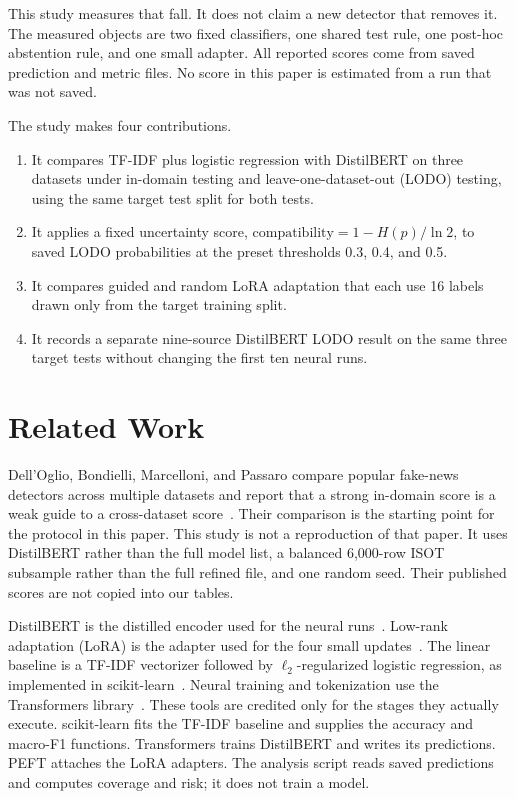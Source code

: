 \documentclass[conference,letterpaper]{IEEEtran}
\begin{document}
This study measures that fall. It does not claim a new detector that removes it. The measured objects are two fixed classifiers, one shared test rule, one post-hoc abstention rule, and one small adapter. All reported scores come from saved prediction and metric files. No score in this paper is estimated from a run that was not saved.

The study makes four contributions.
\begin{enumerate}
\item It compares TF-IDF plus logistic regression with DistilBERT on three datasets under in-domain testing and leave-one-dataset-out (LODO) testing, using the same target test split for both tests.
\item It applies a fixed uncertainty score, $\mathrm{compatibility}=1-H(p)/\ln 2$, to saved LODO probabilities at the preset thresholds 0.3, 0.4, and 0.5.
\item It compares guided and random LoRA adaptation that each use 16 labels drawn only from the target training split.
\item It records a separate nine-source DistilBERT LODO result on the same three target tests without changing the first ten neural runs.
\end{enumerate}

\section{Related Work}
Dell'Oglio, Bondielli, Marcelloni, and Passaro compare popular fake-news detectors across multiple datasets and report that a strong in-domain score is a weak guide to a cross-dataset score~\cite{delloglio2026}. Their comparison is the starting point for the protocol in this paper. This study is not a reproduction of that paper. It uses DistilBERT rather than the full model list, a balanced 6,000-row ISOT subsample rather than the full refined file, and one random seed. Their published scores are not copied into our tables.

DistilBERT is the distilled encoder used for the neural runs~\cite{sanh2019}. Low-rank adaptation (LoRA) is the adapter used for the four small updates~\cite{hu2022}. The linear baseline is a TF-IDF vectorizer followed by $\ell_2$-regularized logistic regression, as implemented in scikit-learn~\cite{pedregosa2011}. Neural training and tokenization use the Transformers library~\cite{wolf2020}. These tools are credited only for the stages they actually execute. scikit-learn fits the TF-IDF baseline and supplies the accuracy and macro-F1 functions. Transformers trains DistilBERT and writes its predictions. PEFT attaches the LoRA adapters. The analysis script reads saved predictions and computes coverage and risk; it does not train a model.
\end{document}
